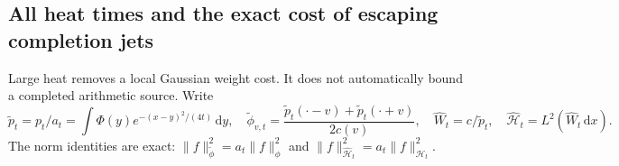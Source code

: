 \documentclass[11pt]{article}
\theoremstyle{remark}\newtheorem{remark}[theorem]{Remark}
\newcommand{\dd}{\,\mathrm d}
\begin{document}
\subsection{All heat times and the exact cost of escaping completion jets}
\label{sec:normalized-heat-flux}

Large heat removes a local Gaussian weight cost. It does not
automatically bound a completed arithmetic source.
Write
\[
 \widetilde p_t=p_t/a_t
  =\int\Phi(y)e^{-(x-y)^2/(4t)}\dd y,\quad
 \widetilde\phi_{v,t}
  =\frac{\widetilde p_t(\cdot-v)+\widetilde p_t(\cdot+v)}{2c(v)},
 \quad\widehat W_t=c/\widetilde p_t,\quad
 \widehat{\mathcal H}_t=L^2(\widehat W_t\dd x).                 \tag{NHA1}
\]
The norm identities are exact:
\(\|f\|_{\widetilde\phi}^2=a_t\|f\|_\phi^2\) and
\(\|f\|_{\widehat{\mathcal H}_t}^2=a_t\|f\|_{\mathcal H_t}^2\).
\end{document}
